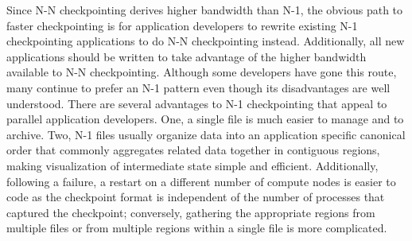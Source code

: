 Since N-N checkpointing derives higher bandwidth than N-1, the obvious path to
faster checkpointing is for application developers to rewrite existing N-1
checkpointing applications to do N-N checkpointing instead.  Additionally, all
new applications should be written to take advantage of the higher bandwidth
available to N-N checkpointing.  Although some developers have gone this route,
many continue to prefer an N-1 pattern even though its disadvantages are well
understood.  There are several advantages to N-1 checkpointing that appeal to
parallel application developers.  One, a single file is much easier to manage
and to archive.  Two, N-1 files usually organize data into an application
specific canonical order that commonly aggregates related data together in
contiguous regions, making visualization of intermediate state simple and
efficient.  Additionally, following a failure, a restart on a different number
of compute nodes is easier to code as the checkpoint format is independent of
the number of processes that captured the checkpoint; conversely, gathering the
appropriate regions from multiple files or from multiple regions within a
single file is more complicated.  


